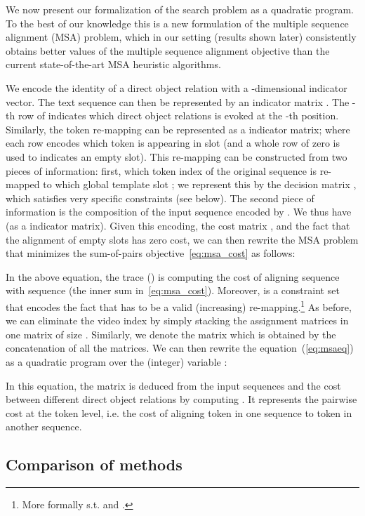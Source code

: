 \documentclass[10pt,twocolumn,letterpaper]{article}
\begin{document}
We now present our formalization of the search problem as a quadratic program.
To the best of our knowledge this is a new formulation of the multiple sequence alignment (MSA) problem, 
which in our setting (results shown later) consistently obtains better values of the multiple sequence alignment objective than the current
state-of-the-art MSA heuristic algorithms.
 
We encode the identity of a direct object relation with a -dimensional
indicator vector.
The text sequence  can then be represented by an indicator matrix .
The -th row of  indicates which direct object relations is evoked at the -th position.
Similarly, the token re-mapping   can
be represented as a  indicator matrix; where 
each row  encodes which token is appearing in slot  (and
a whole row of zero is used to indicates an empty  slot).
This re-mapping can be constructed from two 
pieces of information: first, which token index  of the original sequence
is re-mapped to which global template slot ; 
we represent this by the decision matrix  ,
which satisfies very specific constraints (see below).
The second piece of information is the composition 
of the input sequence encoded by .
We thus have  (as a  indicator
matrix). Given this encoding, the cost matrix , and the fact
that the alignment of empty slots has zero cost, we
can then rewrite the MSA problem that minimizes
the sum-of-pairs objective~\eqref{eq:msa_cost}
as follows:

In the above equation, the trace () is computing the cost of aligning sequence  with sequence 
(the inner sum in~\eqref{eq:msa_cost}).
Moreover,  is a constraint set that encodes the fact that  has to be a valid (increasing) re-mapping.\footnote{More formally   s.t.   and .}
As before, we can eliminate the video index  by simply stacking the assignment matrices  in one matrix  of size .
Similarly, we denote  the  matrix which is obtained by the concatenation of all the  matrices. 
We can then rewrite the equation~(\ref{eq:msaeq}) as a quadratic program over the (integer) variable :


In this equation, the  matrix  is deduced from the input sequences and the cost between different direct object relations by computing .
It represents the pairwise cost at the token level, i.e. the cost of aligning token  in one
sequence to token  in another sequence.


\subsection{Comparison of methods}
\label{subsec:comparison_msa}
\end{document}
